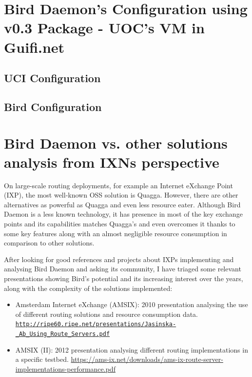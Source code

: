\newpage
\begin{appendices}

\chapter{Bird Daemon's Configuration using v0.3 Package - UOC's VM in Guifi.net}
\label{app:ch:bdcuoc}

\section{UCI Configuration}


\section{Bird Configuration}




\chapter{Bird Daemon vs. other solutions analysis from IXNs perspective}
\label{app:ch:blinks}

On large-scale routing deployments, for example an Internet eXchange Point (IXP), the most well-known OSS solution is Quagga. However, there are other alternatives as powerful as Quagga and even less resource eater. Although Bird Daemon is a less known technology, it has presence in most of the key exchange points and its capabilities matches Quagga's and even overcomes it thanks to some key features along with an almost negligible resource consumption in comparison to other solutions.

After looking for good references and projects about IXPs implementing and analysing Bird Daemon and asking its community, I have triaged some relevant presentations showing Bird's potential and its increasing interest over the years, along with the complexity of the solutions implemented:

\begin{itemize}
    \item Amsterdam Internet eXchange (AMSIX): 2010 presentation analysing the use of different routing solutions and resource consumption data. \href{http://ripe60.ripe.net/presentations/Jasinska-_Ab_Using_Route_Servers.pdf}{\nolinkurl{http://ripe60.ripe.net/presentations/Jasinska-\_Ab\_Using\_Route\_Servers.pdf}}
    
    \item AMSIX (II): 2012 presentation analysing different routing implementations in a specific testbed. \href{https://ams-ix.net/downloads/ams-ix-route-server-implementations-performance.pdf}{https://ams-ix.net/downloads/ams-ix-route-server-implementations-performance.pdf}


\end{itemize}
\end{appendices}
